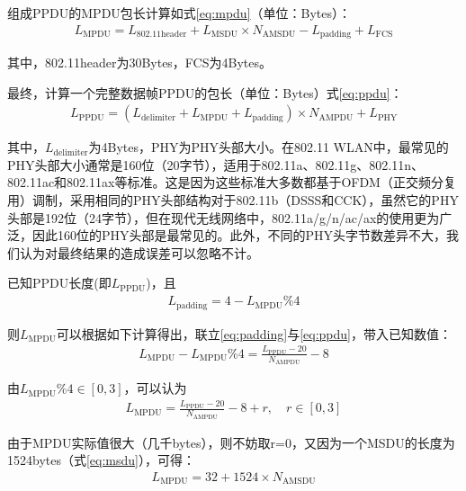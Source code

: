 \documentclass[bwprint]{gmcmthesis}
\begin{document}
组成PPDU的MPDU包长计算如式\ref{eq:mpdu}（单位：Bytes）：
\begin{align}
    L_{\text{MPDU}} = L_{\text{802.11header}} + L_{\text{MSDU}} \times N_{\text{AMSDU}} - L_{\text{padding}} + L_{\text{FCS}} \label{eq:mpdu}
    \end{align}

其中，802.11header为30Bytes，FCS为4Bytes。

最终，计算一个完整数据帧PPDU的包长（单位：Bytes）式\ref{eq:ppdu}：
\begin{align}
    L_{\text{PPDU}} = (L_{\text{delimiter}} + L_{\text{MPDU}} + L_{\text{padding}}) \times N_{\text{AMPDU}} + L_{\text{PHY}} \label{eq:ppdu}
\end{align}


其中，$L_{\text{delimiter}}$为4Bytes，PHY为PHY头部大小。在802.11 WLAN中\cite{rn2,rn3}，最常见的PHY头部大小通常是160位（20字节），适用于802.11a、802.11g、802.11n、802.11ac和802.11ax等标准。这是因为这些标准大多数都基于OFDM（正交频分复用）调制，采用相同的PHY头部结构对于802.11b（DSSS和CCK），虽然它的PHY头部是192位（24字节），但在现代无线网络中，802.11a/g/n/ac/ax的使用更为广泛，因此160位的PHY头部是最常见的。此外，不同的PHY头字节数差异不大，我们认为对最终结果的造成误差可以忽略不计。

已知PPDU长度(即$L_{\text{PPDU}}$)，且
\begin{align}
    L_{\text{padding}} =4 - L_{\text{MPDU}} \% 4 \label{eq:padding}
    \end{align}

则$L_{\text{MPDU}}$可以根据如下计算得出，联立\ref{eq:padding}与\ref{eq:ppdu}，带入已知数值：
\begin{align}
    L_{\text{MPDU}} - L_{\text{MPDU}}\%4 = \frac{L_{\text{PPDU}} - 20}{N_{\text{AMPDU}}} - 8 \label{eq:mpdu2}
    \end{align}
    
由$L_{\text{MPDU}}\%4 \in [0,3]$，可以认为
\begin{align}
    L_{\text{MPDU}} = \frac{L_{\text{PPDU}} - 20}{N_{\text{AMPDU}}} - 8 + r, \quad r \in [0,3] \label{eq:mpdu3}
    \end{align}
    
    由于MPDU实际值很大（几千bytes），则不妨取r=0，又因为一个MSDU的长度为1524bytes（式\ref{eq:msdu}），可得：
    \begin{align}
        L_{\text{MPDU}} = 32 + 1524 \times N_{\text{AMSDU}} \label{eq:mpdu4}
        \end{align}
\end{document}
